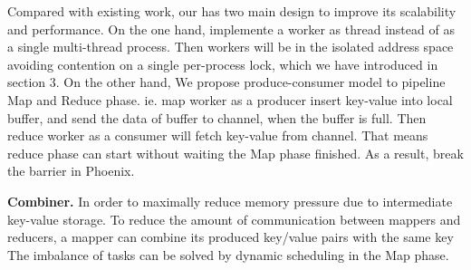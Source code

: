 Compared with existing work, 
our \myds has two main design to improve its scalability and performance.
On the one hand, \myds implemente a worker as \myth thread 
instead of as a single multi-thread process.
Then workers will be in the isolated address space 
avoiding contention on a single per-process lock, 
which we have introduced in section 3.
On the other hand, We propose produce-consumer model to 
pipeline Map and Reduce phase. 
ie. map worker as a producer insert key-value into local buffer, 
and send the data of buffer to channel, when the buffer is full.
Then reduce worker as a consumer will fetch key-value from channel. 
That means reduce phase can start without waiting the Map phase finished.
As a result, \myds break the barrier in Phoenix.


%
{\bf Combiner.}
In order to maximally reduce memory pressure due to intermediate key-value
storage.
To reduce the amount of communication between mappers and reducers, a mapper
can combine its produced key/value pairs with the same key
The imbalance of tasks can be solved by dynamic scheduling in the Map phase. 

